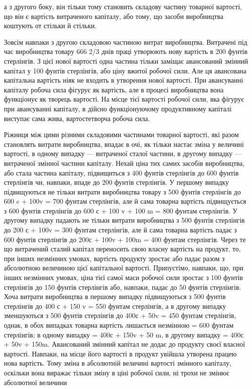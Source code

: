 \parcont{}  %
а з другого боку, він тільки тому становить складову частину
товарної вартості, що він є вартість витраченого капіталу, або
тому, що засоби виробництва коштують от стільки й стільки.

Зовсім навпаки з другою складовою частиною витрат виробництва.
Витрачені під час виробництва товару 666 2/3 днів
праці утворюють нову вартість в 200 фунтів стерлінгів. З цієї
нової вартості одна частина тільки заміщає авансований змінний
капітал у 100 фунтів стерлінгів, або ціну вжитої робочої сили.
Але ця авансована капітальна вартість ніяк не входить в утворення
нової вартості. При авансуванні капіталу робоча сила
фігурує як вартість, але в процесі виробництва вона функціонує
як творець вартості. На місце тієї вартості робочої сили,
яка фігурує при авансуванні капіталу, в дійсно функціонуючому
продуктивному капіталі виступає сама жива, вартостетворча робоча
сила.

Ріжниця між цими різними складовими частинами товарної
вартості, які разом становлять витрати виробництва, впадає
в очі, як тільки настає зміна у величині вартості, в одному випадку
— витраченої сталої частини, в другому випадку — витраченої
змінної частини капіталу. Нехай ціна тих самих засобів виробництва,
або стала частина капіталу, підвищиться з 400 фунтів
стерлінгів до 600 фунтів стерлінгів чи, навпаки, впаде до
200 фунтів стерлінгів. У першому випадку підвищуються не
тільки витрати виробництва товару з 500 фунтів стерлінгів до
600 c + 100v = 700 фунтам стерлінгів, але й сама товарна вартість
підвищується з 600 фунтів стерлінгів до 600 с + 100 v + 100 m =
800 фунтам стерлінгів. У другому випадку падають не тільки
витрати виробництва з 500 фунтів стерлінгів до 200 с + 100v =
300 фунтам стерлінгів, але й сама товарна вартість падає з
600 фунтів стерлінгів до 200с + 100v + 100m = 400 фунтам стерлінгів.
Через те що витрачений сталий капітал переносить свою
власну вартість на продукт, то, при інших незмінних умовах, вартість
продукту зростає або падає разом з абсолютною величиною
цієї капітальної вартості. Припустімо, навпаки, що, при
інших незмінних умовах, ціна тієї самої маси робочої сили зростає
з 100 фунтів стерлінгів до 150 фунтів стерлінгів або,
навпаки, падає до 50 фунтів стерлінгів. Хоча витрати виробництва
в першому випадку підвищуються з 500 фунтів стерлінгів
до 400 с + 150 v = 550 фунтам стерлінгів, а в другому випадку
зменшуються з 500 фунтів стерлінгів до 400с + 50v = 450 фунтам
стерлінгів, однак, в обох випадках товарна вартість лишається
незмінною = 600 фунтам стерлінгів; в одному випадку
= 400с + 150v + 50 m, в другому випадку = 400с + 50v + 150m.
Авансований змінний капітал не додає до продукту своєї власної
вартості. Навпаки, на місце його вартості в продукт увійшла утворена
працею нова вартість. Тому зміна в абсолютній величині
вартості змінного капіталу, оскільки вона виражає тільки зміну
в ціні робочої сили, ні трохи не змінює абсолютної величини
\parbreak{}  %
